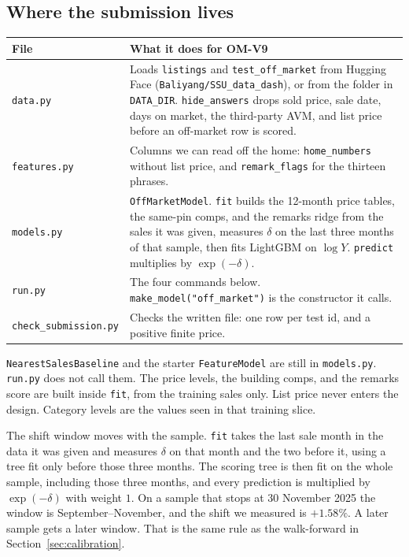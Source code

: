 \documentclass[11pt]{article}
\newcommand{\modelid}{OM-V9}
\begin{document}
\subsection{Where the submission lives}

\begin{center}
\small
\begin{tabular}{p{3.5cm}p{11.2cm}}
\toprule
File & What it does for \modelid{} \\
\midrule
\texttt{data.py} & Loads \texttt{listings} and \texttt{test\_off\_market} from Hugging Face (\texttt{Baliyang/SSU\_data\_dash}), or from the folder in \texttt{DATA\_DIR}. \texttt{hide\_answers} drops sold price, sale date, days on market, the third-party AVM, and list price before an off-market row is scored. \\
\texttt{features.py} & Columns we can read off the home: \texttt{home\_numbers} without list price, and \texttt{remark\_flags} for the thirteen phrases. \\
\texttt{models.py} & \texttt{OffMarketModel}. \texttt{fit} builds the 12-month price tables, the same-pin comps, and the remarks ridge from the sales it was given, measures \(\delta\) on the last three months of that sample, then fits LightGBM on \(\log Y\). \texttt{predict} multiplies by \(\exp(-\delta)\). \\
\texttt{run.py} & The four commands below. \texttt{make\_model("off\_market")} is the constructor it calls. \\
\texttt{check\_submission.py} & Checks the written file: one row per test id, and a positive finite price. \\
\bottomrule
\end{tabular}
\end{center}

\texttt{NearestSalesBaseline} and the starter \texttt{FeatureModel} are still in \texttt{models.py}. \texttt{run.py} does not call them. The price levels, the building comps, and the remarks score are built inside \texttt{fit}, from the training sales only. List price never enters the design. Category levels are the values seen in that training slice.

The shift window moves with the sample. \texttt{fit} takes the last sale month in the data it was given and measures \(\delta\) on that month and the two before it, using a tree fit only before those three months. The scoring tree is then fit on the whole sample, including those three months, and every prediction is multiplied by \(\exp(-\delta)\) with weight \(1\). On a sample that stops at 30 November 2025 the window is September--November, and the shift we measured is \(+1.58\%\). A later sample gets a later window. That is the same rule as the walk-forward in Section~\ref{sec:calibration}.
\end{document}
